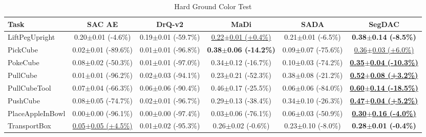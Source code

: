 \begin{table}[htbp]
\centering
\scriptsize
\caption{Hard Ground Color Test}
\label{tab:appendix_groundcolortest_hard}
\begin{adjustbox}{max width=\textwidth}
\begin{tabular}{l*{5}{c}}
\toprule
\textbf{Task} & \textbf{SAC AE} & \textbf{DrQ-v2} & \textbf{MaDi} & \textbf{SADA} & \textbf{SegDAC} \\
\midrule
LiftPegUpright & 0.20$\pm$0.01 \scriptsize{(-4.6\%)} & 0.19$\pm$0.01 \scriptsize{(-59.7\%)} & \underline{0.22$\pm$0.01 \scriptsize{(+0.4\%)}} & 0.21$\pm$0.01 \scriptsize{(-6.5\%)} & \textbf{0.38$\pm$0.14 \scriptsize{(-8.5\%)}} \\
PickCube & 0.02$\pm$0.01 \scriptsize{(-89.6\%)} & 0.01$\pm$0.01 \scriptsize{(-96.8\%)} & \textbf{0.38$\pm$0.06 \scriptsize{(-14.2\%)}} & 0.09$\pm$0.07 \scriptsize{(-75.6\%)} & \underline{0.36$\pm$0.03 \scriptsize{(+6.0\%)}} \\
PokeCube & 0.08$\pm$0.02 \scriptsize{(-50.3\%)} & 0.01$\pm$0.01 \scriptsize{(-97.0\%)} & 0.34$\pm$0.12 \scriptsize{(-16.7\%)} & 0.10$\pm$0.03 \scriptsize{(-74.2\%)} & \textbf{\underline{0.35$\pm$0.04 \scriptsize{(-10.3\%)}}} \\
PullCube & 0.01$\pm$0.01 \scriptsize{(-96.2\%)} & 0.02$\pm$0.03 \scriptsize{(-94.1\%)} & 0.23$\pm$0.21 \scriptsize{(-52.3\%)} & 0.38$\pm$0.08 \scriptsize{(-21.2\%)} & \textbf{\underline{0.52$\pm$0.08 \scriptsize{(+3.2\%)}}} \\
PullCubeTool & 0.07$\pm$0.04 \scriptsize{(-66.3\%)} & 0.06$\pm$0.06 \scriptsize{(-90.4\%)} & 0.46$\pm$0.17 \scriptsize{(-25.5\%)} & 0.06$\pm$0.06 \scriptsize{(-84.0\%)} & \textbf{\underline{0.60$\pm$0.14 \scriptsize{(-18.5\%)}}} \\
PushCube & 0.08$\pm$0.05 \scriptsize{(-74.7\%)} & 0.02$\pm$0.01 \scriptsize{(-96.7\%)} & 0.29$\pm$0.13 \scriptsize{(-38.4\%)} & 0.34$\pm$0.10 \scriptsize{(-26.3\%)} & \textbf{\underline{0.47$\pm$0.04 \scriptsize{(+5.2\%)}}} \\
PlaceAppleInBowl & 0.00$\pm$0.00 \scriptsize{(-96.1\%)} & 0.00$\pm$0.00 \scriptsize{(-97.4\%)} & 0.03$\pm$0.06 \scriptsize{(-76.1\%)} & 0.06$\pm$0.03 \scriptsize{(-50.9\%)} & \textbf{\underline{0.30$\pm$0.16 \scriptsize{(-4.0\%)}}} \\
TransportBox & \underline{0.05$\pm$0.05 \scriptsize{(+4.5\%)}} & 0.01$\pm$0.02 \scriptsize{(-95.3\%)} & 0.26$\pm$0.02 \scriptsize{(-0.6\%)} & 0.23$\pm$0.10 \scriptsize{(-8.0\%)} & \textbf{0.28$\pm$0.01 \scriptsize{(-0.4\%)}} \\
\bottomrule
\end{tabular}
\end{adjustbox}
\end{table}

